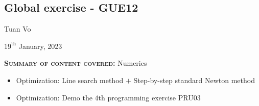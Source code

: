 \documentclass[12pt]{article}
\begin{document}
\begin{center}
	\section*{Global exercise - GUE12}
\end{center}
\begin{center}
	Tuan Vo
\end{center}
\begin{center}
	$19^{\text{th}}$ January, 2023
\end{center}
\textbf{\textsc{Summary of content covered:}} Numerics
\begin{itemize}
	\item[\checkmark] Optimization: Line search method $+$ Step-by-step standard Newton method
	\item[\checkmark] Optimization: Demo the $4$th programming exercise PRU03
\end{itemize}
\end{document}
